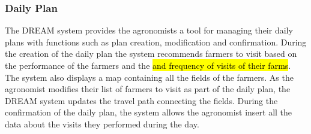 \begin{flushleft}
\subsubsection{Daily Plan}
The DREAM system provides the agronomists a tool for managing their daily plans with functions such as plan creation, modification and confirmation. During the creation of the daily plan the system recommends farmers to visit based on the performance of the farmers and the \hl{and frequency of visits of their farms}. The system also displays a map containing all the fields of the farmers. As the agronomist modifies their list of farmers to visit as part of the daily plan, the DREAM system updates the travel path connecting the fields. During the confirmation of the daily plan, the system allows the agronomist insert all the data about the visits they performed during the day.
\end{flushleft}

